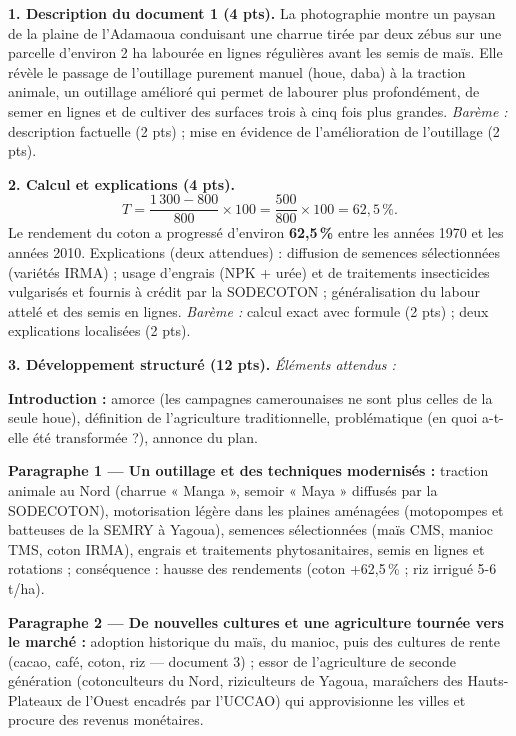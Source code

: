 \documentclass[11pt]{article}
\newcommand{\cle}[1]{{\popxbold\color{popdark}#1}}
\begin{document}
\begin{corrige}
\textbf{1. Description du document 1 (4 pts).} La photographie montre un paysan de la plaine de l'Adamaoua conduisant une charrue tirée par deux zébus sur une parcelle d'environ 2 ha labourée en lignes régulières avant les semis de maïs. Elle révèle le passage de l'outillage purement manuel (houe, daba) à la \cle{traction animale}, un outillage amélioré qui permet de labourer plus profondément, de semer en lignes et de cultiver des surfaces trois à cinq fois plus grandes. \emph{Barème :} description factuelle (2 pts) ; mise en évidence de l'amélioration de l'outillage (2 pts).

\textbf{2. Calcul et explications (4 pts).}
\[ T = \frac{1\,300 - 800}{800} \times 100 = \frac{500}{800} \times 100 = 62{,}5\,\%. \]
Le rendement du coton a progressé d'environ \textbf{62,5\,\%} entre les années 1970 et les années 2010. Explications (deux attendues) : diffusion de semences sélectionnées (variétés IRMA) ; usage d'engrais (NPK + urée) et de traitements insecticides vulgarisés et fournis à crédit par la SODECOTON ; généralisation du labour attelé et des semis en lignes. \emph{Barème :} calcul exact avec formule (2 pts) ; deux explications localisées (2 pts).

\textbf{3. Développement structuré (12 pts).} \emph{Éléments attendus :}

\textbf{Introduction :} amorce (les campagnes camerounaises ne sont plus celles de la seule houe), définition de l'agriculture traditionnelle, problématique (en quoi a-t-elle été transformée ?), annonce du plan.

\textbf{Paragraphe 1 — Un outillage et des techniques modernisés :} traction animale au Nord (charrue « Manga », semoir « Maya » diffusés par la SODECOTON), motorisation légère dans les plaines aménagées (motopompes et batteuses de la SEMRY à Yagoua), semences sélectionnées (maïs CMS, manioc TMS, coton IRMA), engrais et traitements phytosanitaires, semis en lignes et rotations ; conséquence : hausse des rendements (coton +62,5\,\% ; riz irrigué 5-6 t/ha).

\textbf{Paragraphe 2 — De nouvelles cultures et une agriculture tournée vers le marché :} adoption historique du maïs, du manioc, puis des cultures de rente (cacao, café, coton, riz — document 3) ; essor de l'\cle{agriculture de seconde génération} (cotonculteurs du Nord, riziculteurs de Yagoua, maraîchers des Hauts-Plateaux de l'Ouest encadrés par l'UCCAO) qui approvisionne les villes et procure des revenus monétaires.


\end{corrige}
\end{document}
